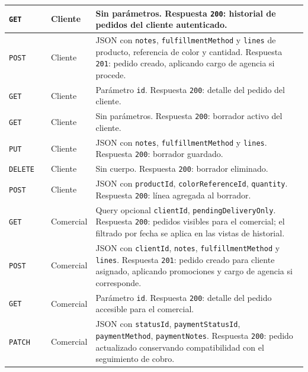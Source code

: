 {\apiTableSetup
{}
\tablefirsthead{\apiHeader}
\tablehead{\apiHeader}
\begin{supertabular}{|A{0.10\textwidth}|A{0.27\textwidth}|A{0.15\textwidth}|A{0.38\textwidth}|}
\texttt{GET} &  & Cliente & Sin parámetros. Respuesta \texttt{200}: historial de pedidos del cliente autenticado.\\
\hline
\texttt{POST} &  & Cliente & JSON con \texttt{notes}, \texttt{fulfillmentMethod} y \texttt{lines} de producto, referencia de color y cantidad. Respuesta \texttt{201}: pedido creado, aplicando cargo de agencia si procede.\\
\hline
\texttt{GET} &  & Cliente & Parámetro \texttt{id}. Respuesta \texttt{200}: detalle del pedido del cliente.\\
\hline
\texttt{GET} &  & Cliente & Sin parámetros. Respuesta \texttt{200}: borrador activo del cliente.\\
\hline
\texttt{PUT} &  & Cliente & JSON con \texttt{notes}, \texttt{fulfillmentMethod} y \texttt{lines}. Respuesta \texttt{200}: borrador guardado.\\
\hline
\texttt{DELETE} &  & Cliente & Sin cuerpo. Respuesta \texttt{200}: borrador eliminado.\\
\hline
\texttt{POST} &  & Cliente & JSON con \texttt{productId}, \texttt{colorReferenceId}, \texttt{quantity}. Respuesta \texttt{200}: línea agregada al borrador.\\
\hline
\texttt{GET} &  & Comercial & Query opcional \texttt{clientId}, \texttt{pendingDeliveryOnly}. Respuesta \texttt{200}: pedidos visibles para el comercial; el filtrado por fecha se aplica en las vistas de historial.\\
\hline
\texttt{POST} &  & Comercial & JSON con \texttt{clientId}, \texttt{notes}, \texttt{fulfillmentMethod} y \texttt{lines}. Respuesta \texttt{201}: pedido creado para cliente asignado, aplicando promociones y cargo de agencia si corresponde.\\
\hline
\texttt{GET} &  & Comercial & Parámetro \texttt{id}. Respuesta \texttt{200}: detalle del pedido accesible para el comercial.\\
\hline
\texttt{PATCH} &  & Comercial & JSON con \texttt{statusId}, \texttt{paymentStatusId}, \texttt{paymentMethod}, \texttt{paymentNotes}. Respuesta \texttt{200}: pedido actualizado conservando compatibilidad con el seguimiento de cobro.\\

\end{supertabular}}
